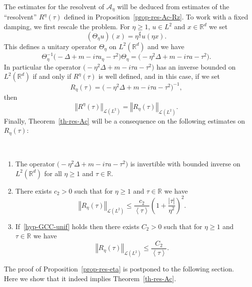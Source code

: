 \documentclass[AHL,Unicode,longabstracts]{cedram}
\newcommand{\abs}[1]{\left\vert #1\right\vert}
\newcommand{\nr}[1]{\left\Vert #1\right\Vert}
\newcommand{\pppg}[1] {\left< #1 \right>}
\renewcommand{\leq}{\leqslant}
\renewcommand{\geq}{\geqslant}
\newcommand{\inv}{^{-1}}
\newcommand{\1}{\mathds 1}
\newcommand{\R}{\mathbb{R}}
\newcommand{\D}{\Delta}
\newcommand{\Th}{\Theta}
\renewcommand{\t}{\tau}
\newcommand{\Ac}{{\mathcal A}}
\newcommand{\Lc}{{\mathcal L}}
\begin{document}
The estimates for the resolvent of $\Ac_\eta$ will be deduced from estimates of the ``resolvent'' $R^\eta(\t)$ defined in Proposition~\ref{prop-res-Ac-Rz}. To work with a fixed damping, we first rescale the problem. For $\eta \geq 1$, $u \in L^2$ and $x \in \R^d$ we set
\[
(\Th_\eta u)(x) = \eta^{\frac d 2} u(\eta x).
\]
This defines a unitary operator $\Th_\eta$ on $L^2(\R^d)$ and we have
\[
\Th_\eta\inv \big(-\D + m -i \t a_\eta - \t^2\big) \Th_\eta = \big(-\eta^2 \D + m -i \t a - \t^2\big).
\]
In particular the operator $\big(-\eta^2 \D + m -i \t a - \t^2\big)$ has an inverse bounded on $L^2(\R^d)$ if and only if $R^\eta(\t)$ is well defined, and in this case, if we set
\begin{equation}\label{def-Reta}
R_\eta(\t) = \big(-\eta^2 \D + m -i \t a - \t^2\big)\inv,
\end{equation}
then
\begin{equation}\label{eq-norm-res-eta}
\nr{R^\eta(\t)}_{\Lc(L^2)} = \nr{R_\eta(\t)}_{\Lc(L^2)}.
\end{equation}
Finally, Theorem~\ref{th-res-Ac} will be a consequence on the following estimates on $R_\eta(\t)$:

\let\oldpointir\pointir
\renewcommand*{\pointir}{}
\begin{prop}\label{prop-res-eta}\ 
\begin{enumerate}%
\item The operator ${\big(-\eta^2 \D + m -i \t a - \t^2\big)}$ is invertible with bounded inverse on $L^2(\R^d)$ for all $\eta \geq 1$ and $\t \in \R$.
\item There exists $c_2 > 0$ such that for $\eta \geq 1$ and $\t \in \R$ we have
\[
\nr{R_\eta(\t)}_{\Lc(L^2)} \leq \frac {c_2}{\pppg \tau} \left(1 + \frac {\abs \t} {\eta^2} \right)^2.
\]
\item If~\eqref{hyp-GCC-unif} holds then there exists $C_2 > 0$ such that for $\eta \geq 1$ and $\t \in \R$ we have
\[
\nr{R_\eta(\t)}_{\Lc(L^2)} \leq \frac {C_2} {\pppg \t}.
\]
\end{enumerate}
\end{prop}
\let\pointir\oldpointir

The proof of Proposition~\ref{prop-res-eta} is postponed to the following section. Here we show that it indeed implies Theorem~\ref{th-res-Ac}.
\end{document}
